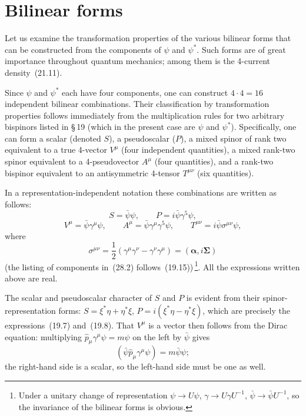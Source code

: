\section{Bilinear forms}

Let us examine the transformation properties of the various bilinear forms that can be constructed from the components of $\psi$ and $\psi^*$. Such forms are of great importance throughout quantum mechanics; among them is the 4-current density~(21.11).

Since $\psi$ and $\psi^*$ each have four components, one can construct $4 \cdot 4 = 16$ independent bilinear combinations. Their classification by transformation properties follows immediately from the multiplication rules for two arbitrary bispinors listed in \S\,19 (which in the present case are $\psi$ and $\psi^*$). Specifically, one can form a scalar (denoted $S$), a pseudoscalar ($P$), a mixed spinor of rank two equivalent to a true 4-vector $V^\mu$ (four independent quantities), a mixed rank-two spinor equivalent to a 4-pseudovector $A^\mu$ (four quantities), and a rank-two bispinor equivalent to an antisymmetric 4-tensor $T^{\mu\nu}$ (six quantities).

In a representation-independent notation these combinations are written as follows:
\begin{equation}
S = \bar\psi\psi,\qquad P = i\bar\psi\gamma^5\psi,
\end{equation}
\begin{equation}
V^\mu = \bar\psi\gamma^\mu\psi,\qquad A^\mu = \bar\psi\gamma^\mu\gamma^5\psi,\qquad T^{\mu\nu} = i\bar\psi\sigma^{\mu\nu}\psi,
\tag{28.1}
\end{equation}
where
\begin{equation}
\sigma^{\mu\nu} = \frac{1}{2}(\gamma^\mu\gamma^\nu - \gamma^\nu\gamma^\mu) = (\boldsymbol{\alpha},i\boldsymbol{\Sigma})
\tag{28.2}
\end{equation}
(the listing of components in~(28.2) follows~(19.15))\,\footnote{Under a unitary change of representation $\psi \to U\psi$, $\gamma \to U\gamma U^{-1}$, $\bar\psi \to \bar\psi U^{-1}$, so the invariance of the bilinear forms is obvious.}. All the expressions written above are real.

The scalar and pseudoscalar character of $S$ and $P$ is evident from their spinor-representation forms:
$S = \xi^*\eta + \eta^*\xi$, $P = i(\xi^*\eta - \eta^*\xi)$,
which are precisely the expressions~(19.7) and~(19.8). That $V^\mu$ is a vector then follows from the Dirac equation: multiplying $\widehat p_\mu\gamma^\mu\psi = m\psi$ on the left by $\bar\psi$ gives
\[
(\bar\psi\widehat p_\mu\gamma^\mu\psi) = m\bar\psi\psi;
\]
the right-hand side is a scalar, so the left-hand side must be one as well.

